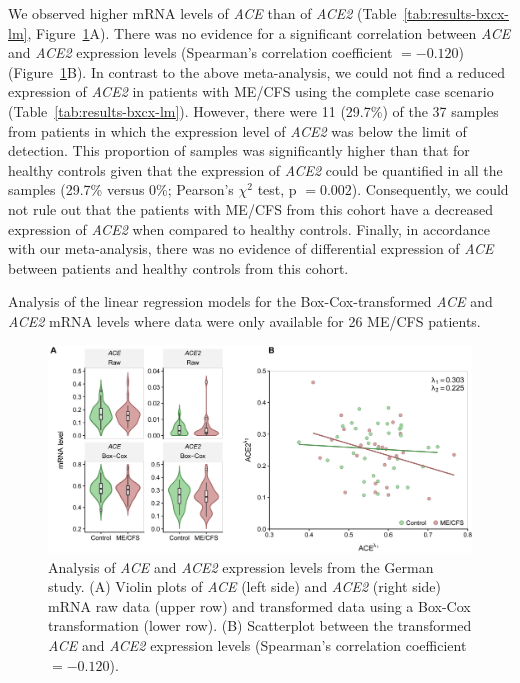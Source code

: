 We observed higher mRNA levels of \textit{ACE} than of \textit{ACE2} (Table~\ref{tab:results-bxcx-lm}, Figure~\ref{fig:mrna-correlation}A). There was no evidence for a significant correlation between \textit{ACE} and \textit{ACE2} expression levels (Spearman's correlation coefficient $= -0.120$) (Figure~\ref{fig:mrna-correlation}B). In contrast to the above meta-analysis, we could not find a reduced expression of \textit{ACE2} in patients with ME/CFS using the complete case scenario (Table~\ref{tab:results-bxcx-lm}). However, there were 11 (29.7\%) of the 37 samples from patients in which the expression level of \textit{ACE2} was below the limit of detection. This proportion of samples was significantly higher than that for healthy controls given that the expression of \textit{ACE2} could be quantified in all the samples (29.7\% versus 0\%; Pearson's $\chi^2$ test, p $= 0.002$). Consequently, we could not rule out that the patients with ME/CFS from this cohort have a decreased expression of \textit{ACE2} when compared to healthy controls. Finally, in accordance with our meta-analysis, there was no evidence of differential expression of \textit{ACE} between patients and healthy controls from this cohort.

\begin{table}[h]
    \centering
    \caption[Analysis of the linear regression models for the Box-Cox-transformed \textit{ACE} and \textit{ACE2} mRNA levels]{Analysis of the linear regression models for the Box-Cox-transformed \textit{ACE} and \textit{ACE2} mRNA levels where data were only available for 26 ME/CFS patients.}
    
    \label{tab:results-bxcx-lm}
\end{table}

\begin{figure}
    \centering
    \includegraphics[width=\textwidth]{chapter/2021-ace-ace2/figures/fig4-mrna-correlation.jpg}
    \caption[Analysis of \textit{ACE} and \textit{ACE2} expression levels from the German study]{Analysis of \textit{ACE} and \textit{ACE2} expression levels from the German study. (A) Violin plots of \textit{ACE} (left side) and \textit{ACE2} (right side) mRNA raw data (upper row) and transformed data using a Box-Cox transformation (lower row). (B) Scatterplot between the transformed \textit{ACE} and \textit{ACE2} expression levels (Spearman's correlation coefficient $= -0.120$).}
    \label{fig:mrna-correlation}
\end{figure}

